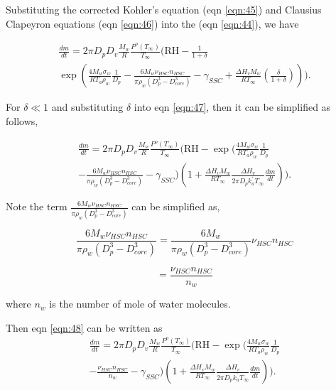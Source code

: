 \documentclass[12pt]{amsart}
\begin{document}
Substituting the corrected Kohler's equation (eqn \ref{eqn:45}) and Clausius Clapeyron equations (eqn \ref{eqn:46}) into the (eqn \ref{eqn:44}), we have

\begin{eqnarray}\label{eqn:47}
\frac{dm}{dt}=2 \pi D_{p} D_{v}  \frac{M_{w}}{R} \frac{P^{o}(T_{\infty})} {T_{\infty}} (\textrm{RH} - \frac{1}{1+\delta}  \\ \nonumber
\exp( \frac{4 M_{w}\sigma_{w}}{R T_{a} \rho_w}\frac{1}{D_{p}}-\frac{6M_{w}\nu_{HSC}n_{HSC}}{\pi \rho_{w}(D_{p}^{3}-D_{core}^{3})}-\gamma_{SSC}+\frac{\Delta H_{v} M_{w}}{R T_{\infty}} (\frac{\delta}{1+\delta}))).  \nonumber
\end{eqnarray}

For $\delta \ll 1$ and substituting $\delta$ into eqn \ref{eqn:47}, then it  can be simplified as follows, 

\begin{eqnarray}\label{eqn:48}
\frac{dm}{dt}=2 \pi D_{p} D_{v}  \frac{M_{w}}{R} \frac{P^{o}(T_{\infty})} {T_{\infty}} (\textrm{RH} - \exp( \frac{4 M_{w}\sigma_{w}}{R T_{a} 
\rho_{w}} \frac{1}{D_{p}}\\ \nonumber 
-\frac{6M_{w}\nu_{HSC}n_{HSC}}{\pi \rho_{w}(D_{p}^{3}-D_{core}^{3})}-\gamma_{SSC})(1+\frac{\Delta H_{v} M_{w}}{R T_{\infty}} \frac{\Delta H_{v}}{2 \pi D_{p} k^{'}_{a} T_{\infty}} \frac{dm}{dt})). \nonumber
\end{eqnarray}

Note the term $\frac{6M_{w}\nu_{HSC}n_{HSC}}{\pi \rho_{w}(D_{p}^{3}-D_{core}^{3})}$ can be simplified as,

\begin{equation}\label{eqn:49}
\frac{6M_{w}\nu_{HSC}n_{HSC}}{\pi \rho_{w}(D_{p}^{3}-D_{core}^{3})}=\frac{6M_{w}}{\pi \rho_{w}(D_{p}^{3}-D_{core}^{3})}\nu_{HSC}n_{HSC}
\end{equation}

\begin{equation}\label{eqn:50}
=\frac{\nu_{HSC}n_{HSC}}{n_{w}}
\end{equation}

where $n_{w}$ is the number of mole of water molecules. 

Then eqn \ref{eqn:48} can be written as 
\begin{eqnarray}\label{eqn:53}
\frac{dm}{dt}=2 \pi D_{p} D_{v}  \frac{M_{w}}{R} \frac{P^{o}(T_{\infty})} {T_{\infty}} 
(\textrm{RH} - \exp( \frac{4 M_{w} \sigma_{w}}{R T_{a} \rho_{w}} \frac{1}{D_{p}}\\ \nonumber
-\frac{\nu_{HSC}n_{HSC}}{n_{w}}-\gamma_{SSC})(1+\frac{\Delta H_{v} M_{w}}{R T_{\infty}} \frac{\Delta H_{v}}{2 \pi D_{p} k^{'}_{a} T_{\infty}} \frac{dm}{dt})). \nonumber
\end{eqnarray}
\end{document}
